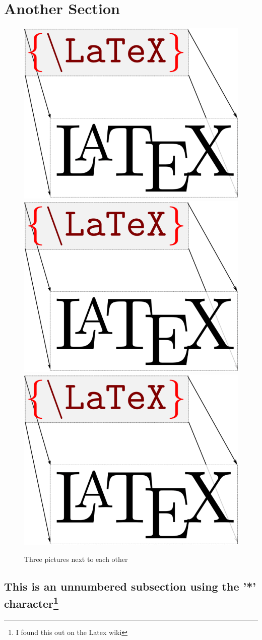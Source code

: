 \section{Another Section}

\begin{figure}[ht]
\caption{Three pictures next to each other}
\includegraphics[width=.3\linewidth]{typeset-your-document-in-latex.png}\quad\includegraphics[width=.3\linewidth]{typeset-your-document-in-latex.png}\quad\includegraphics[width=.3\linewidth]{typeset-your-document-in-latex.png}
\end{figure}

\subsection*{This is an unnumbered subsection using the '*' character\footnote{I found this out on the Latex wiki}}
